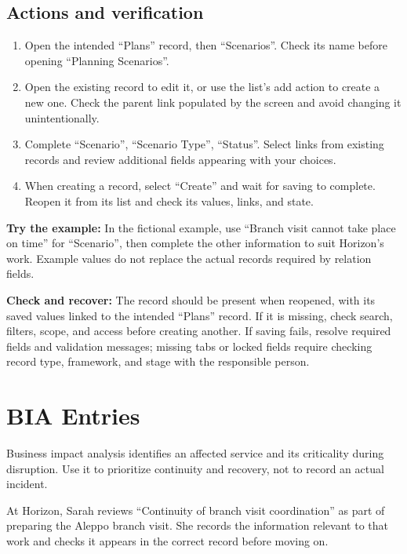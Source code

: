 \subsection{Actions and verification}
\begin{enumerate}
\item Open the intended “Plans” record, then “Scenarios”. Check its name before opening “Planning Scenarios”.
\item Open the existing record to edit it, or use the list's add action to create a new one. Check the parent link populated by the screen and avoid changing it unintentionally.
\item Complete “Scenario”, “Scenario Type”, “Status”. Select links from existing records and review additional fields appearing with your choices.
\item When creating a record, select “Create” and wait for saving to complete. Reopen it from its list and check its values, links, and state.
\end{enumerate}

\textbf{Try the example:} In the fictional example, use “Branch visit cannot take place on time” for “Scenario”, then complete the other information to suit Horizon's work. Example values do not replace the actual records required by relation fields.

\textbf{Check and recover:} The record should be present when reopened, with its saved values linked to the intended “Plans” record. If it is missing, check search, filters, scope, and access before creating another. If saving fails, resolve required fields and validation messages; missing tabs or locked fields require checking record type, framework, and stage with the responsible person.

\clearpage
\section{BIA Entries}
\label{sec:projects-feature-planning-bia-entries}

Business impact analysis identifies an affected service and its criticality during disruption. Use it to prioritize continuity and recovery, not to record an actual incident.

\begin{rcnote}
At Horizon, Sarah reviews “Continuity of branch visit coordination” as part of preparing the Aleppo branch visit. She records the information relevant to that work and checks it appears in the correct record before moving on.
\end{rcnote}

